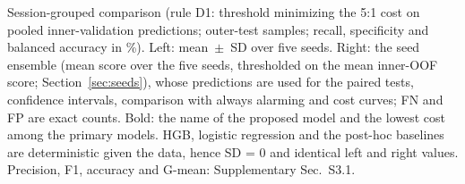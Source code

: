 \begin{table}[t]
\centering
\caption{Session-grouped comparison (rule D1: threshold minimizing the 5:1 cost on pooled inner-validation predictions; \nSamplesEval{} outer-test samples; recall, specificity and balanced accuracy in \%). Left: mean~$\pm$~SD over five seeds. Right: the seed ensemble (mean score over the five seeds, thresholded on the mean inner-OOF score; Section~\ref{sec:seeds}), whose predictions are used for the paired tests, confidence intervals, comparison with always alarming and cost curves; FN and FP are exact counts. Bold: the name of the proposed model and the lowest cost among the primary models. HGB, logistic regression and the post-hoc baselines are deterministic given the data, hence SD = 0 and identical left and right values. Precision, F1, accuracy and G-mean: Supplementary Sec.~S3.1.}
\label{tab:main}
\resizebox{\textwidth}{!}{}
\end{table}

